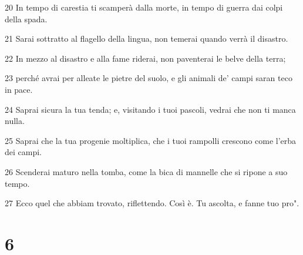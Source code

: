 \par 20 In tempo di carestia ti scamperà dalla morte, in tempo di guerra dai colpi della spada.
\par 21 Sarai sottratto al flagello della lingua, non temerai quando verrà il disastro.
\par 22 In mezzo al disastro e alla fame riderai, non paventerai le belve della terra;
\par 23 perché avrai per alleate le pietre del suolo, e gli animali de' campi saran teco in pace.
\par 24 Saprai sicura la tua tenda; e, visitando i tuoi pascoli, vedrai che non ti manca nulla.
\par 25 Saprai che la tua progenie moltiplica, che i tuoi rampolli crescono come l'erba dei campi.
\par 26 Scenderai maturo nella tomba, come la bica di mannelle che si ripone a suo tempo.
\par 27 Ecco quel che abbiam trovato, riflettendo. Così è. Tu ascolta, e fanne tuo pro".

\chapter{6}

